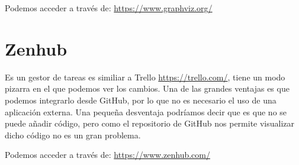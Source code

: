 Podemos acceder a través de: 
\url{https://www.graphviz.org/}

\section{Zenhub}
Es un gestor de tareas es similiar a Trello \url{https://trello.com/}, tiene un modo pizarra en el que podemos ver los cambios. Una de las grandes ventajas es que podemos integrarlo desde GitHub, por lo que no es necesario el uso de una aplicación externa. Una pequeña desventaja podríamos decir que es que no se puede añadir código, pero como el repositorio de GitHub nos permite visualizar dicho código no es un gran problema.

Podemos acceder a través de: 
\url{https://www.zenhub.com/}